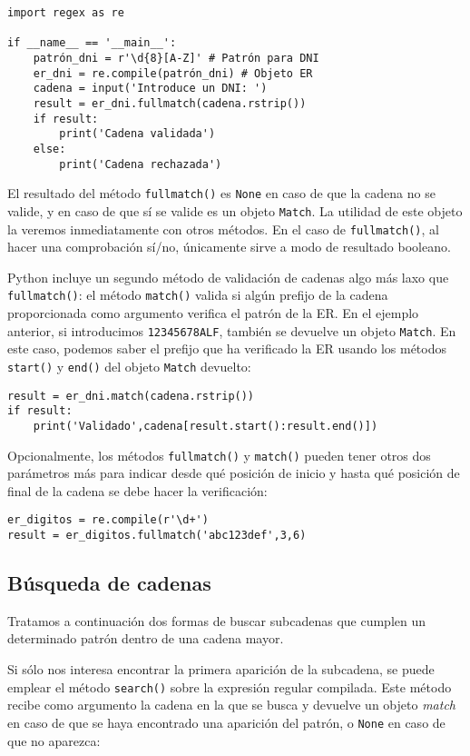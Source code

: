 \begin{lstlisting}
import regex as re

if __name__ == '__main__':
    patrón_dni = r'\d{8}[A-Z]' # Patrón para DNI
    er_dni = re.compile(patrón_dni) # Objeto ER
    cadena = input('Introduce un DNI: ')
    result = er_dni.fullmatch(cadena.rstrip())
    if result:
        print('Cadena validada')
    else:
        print('Cadena rechazada')
\end{lstlisting}

El resultado del método \texttt{fullmatch()} es \texttt{None} en caso de que la cadena no se valide, y en caso de que sí se valide es un objeto \texttt{Match}. La utilidad de este objeto la veremos inmediatamente con otros métodos. En el caso de \texttt{fullmatch()}, al hacer una comprobación sí/no, únicamente sirve a modo de resultado booleano.

Python incluye un segundo método de validación de cadenas algo más laxo que \texttt{fullmatch()}: el método \texttt{match()} valida si algún prefijo de la cadena proporcionada como argumento verifica el patrón de la ER. En el ejemplo anterior, si introducimos \texttt{12345678ALF}, también se devuelve un objeto \texttt{Match}. En este caso, podemos saber el prefijo que ha verificado la ER usando los métodos \texttt{start()} y \texttt{end()} del objeto \texttt{Match} devuelto:

\begin{lstlisting}
result = er_dni.match(cadena.rstrip())
if result:
    print('Validado',cadena[result.start():result.end()])
\end{lstlisting}

Opcionalmente, los métodos \texttt{fullmatch()} y \texttt{match()} pueden tener otros dos parámetros más para indicar desde qué posición de inicio y hasta qué posición de final de la cadena se debe hacer la verificación:

\begin{lstlisting}
er_digitos = re.compile(r'\d+')
result = er_digitos.fullmatch('abc123def',3,6)
\end{lstlisting}


\subsection{Búsqueda de cadenas}

Tratamos a continuación dos formas de buscar subcadenas que cumplen un determinado patrón dentro de una cadena mayor. 

Si sólo nos interesa encontrar la primera aparición de la subcadena, se puede emplear el método \texttt{search()} sobre la expresión regular compilada. Este método recibe como argumento la cadena en la que se busca y devuelve un objeto \emph{match} en caso de que se haya encontrado una aparición del patrón, o \texttt{None} en caso de que no aparezca:

